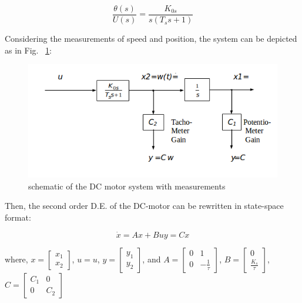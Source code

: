 \documentclass[11pt,a4paper]{article}
\begin{document}
\begin{equation} \label{eq:8}
\frac{\theta(s)}{U(s)} = \frac{K_{0s}}{s(T_{s} s + 1)}
\end{equation}

Considering the measurements of speed and position, the system can be depicted as in Fig. ~\ref{fig:servomeasschem}:

\begin{figure}[here]
\includegraphics[width=\textwidth]{imglab/servomeasurementschematic.png}
\caption{schematic of the DC motor system with measurements}
\label{fig:servomeasschem}
\end{figure}

Then, the second order D.E. of the DC-motor can be rewritten in state-space format:

\begin{equation} \label{eq:9}
\dot{x} = Ax  + Bu 
 y = Cx
\end{equation}

where, $x = \left[\begin{matrix}x_{1} \\ x_{2}\end{matrix}\right]$, $u=u$, $y = \left[\begin{matrix}y_{1} \\ y_{2}\end{matrix}\right]$, and
$A = \left[\begin{matrix}0 & 1 \\ 0 & -\frac{1}{\tau}\end{matrix}\right]$, $B=\left[\begin{matrix} 0 \\ \frac{K_{s}}{\tau} \end{matrix}\right]$, $C = \left[\begin{matrix}C_{1} & 0 \\ 0 & C_{2} \end{matrix}\right]$
\end{document}
